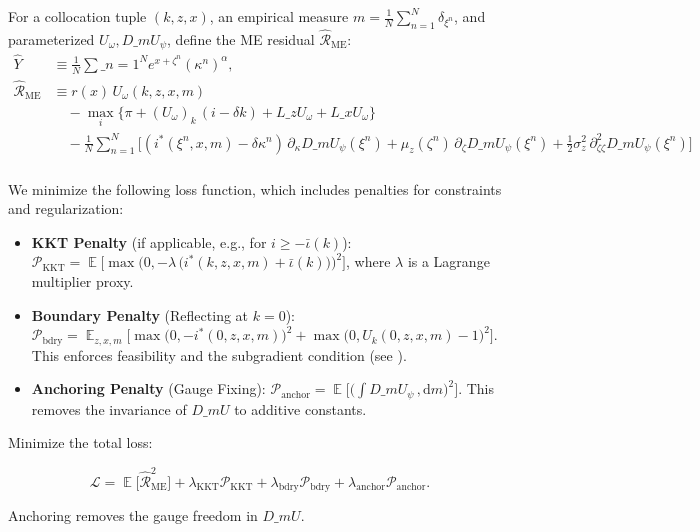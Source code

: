 ﻿\documentclass[11pt,letterpaper,oneside]{article}
\numberwithin{equation}{section}
\DeclareMathOperator{\E}{\mathbb{E}}
\newcommand{\1}{\mathbf{1}}
\newcommand{\diff}{,\mathrm{d}}
\newcommand{\Lz}{L\_z}
\newcommand{\Lx}{L\_x}
\newcommand{\dmU}{D\_m U}
\newcommand{\kbar}{\bar\iota}
\begin{document}
\begin{tcolorbox}[didacticstyle]
\begin{itemize}[leftmargin=1.1em,itemsep=0.25em]
For a collocation tuple $(k,z,x)$, an empirical measure $m=\tfrac1N\sum_{n=1}^N \delta_{\xi^n}$, and parameterized $U_\omega,\dmU_\psi$, define the ME residual $\widehat{\mathcal{R}}_{\mathrm{ME}}$:
\begin{align*}
\widehat{Y} &\equiv \frac{1}{N}\sum\_{n=1}^N e^{x+\zeta^n}(\kappa^n)^\alpha,\\
\widehat{\mathcal{R}}_{\mathrm{ME}} &\equiv r(x)\,U_\omega(k,z,x,m)\\
  &\quad - \max_{i}\Big\{ \pi + (U_{\omega})_k\,(i-\delta k) + \Lz U_{\omega} + \Lx U_{\omega} \Big\} \\
  &\quad - \frac{1}{N}\sum_{n=1}^N \Big[ (i^*(\xi^n,x,m)-\delta\kappa^n)\,\partial_{\kappa}\dmU_{\psi}(\xi^n)
    + \mu_z(\zeta^n)\,\partial_{\zeta}\dmU_{\psi}(\xi^n)
    + \tfrac12 \sigma_z^2\,\partial^2_{\zeta\zeta}\dmU_{\psi}(\xi^n) \Big] \\
  &\quad \phantom{.}
  \end{align*}

We minimize the following loss function, which includes penalties for constraints and regularization:

\begin{itemize}[leftmargin=1.25em]
    \item \textbf{KKT Penalty} (if applicable, e.g., for $i\ge -\kbar(k)$): $\displaystyle \mathcal{P}_{\mathrm{KKT}} = \E\Big[ \max\big(0, -\lambda\,\big(i^*(k,z,x,m)+\kbar(k)\big)\big)^2 \Big]$, where $\lambda$ is a Lagrange multiplier proxy.
    \item \textbf{Boundary Penalty} (Reflecting at $k=0$): $\displaystyle \mathcal{P}_{\mathrm{bdry}} = \E_{z,x,m}\Big[ \max\big(0, -i^*(0,z,x,m)\big)^2 + \max\big(0, U_k(0,z,x,m)-1\big)^2 \Big]$. This enforces feasibility and the subgradient condition (see ).
    \item \textbf{Anchoring Penalty} (Gauge Fixing): $\displaystyle \mathcal{P}_{\mathrm{anchor}}=\E\Big[\Big(\int \dmU_\psi\,\diff m\Big)^2\Big]$. This removes the invariance of $\dmU$ to additive constants.
\end{itemize}

Minimize the total loss:

$$
\mathcal{L}=\E\big[\widehat{\mathcal{R}}_{\mathrm{ME}}^2\big]+\lambda_{\mathrm{KKT}}\mathcal{P}_{\mathrm{KKT}}
+\lambda_{\mathrm{bdry}}\mathcal{P}_{\mathrm{bdry}}+\lambda_{\mathrm{anchor}}\mathcal{P}_{\mathrm{anchor}}.
$$

Anchoring removes the gauge freedom in $\dmU$.


\end{itemize}
\end{tcolorbox}
\end{document}
